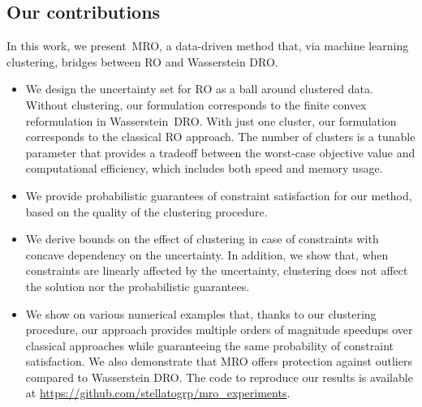

\subsection{Our contributions}%
\label{sub:our_contributions}
In this work, we present~\gls{MRO}, a data-driven method that, via machine learning clustering, bridges between \gls{RO} and  Wasserstein \gls{DRO}.
\begin{itemize}
	\item We design the uncertainty set for \gls{RO} as a ball around clustered data. Without clustering, our formulation corresponds to the finite convex reformulation in Wasserstein~\gls{DRO}.
With just one cluster, our formulation corresponds to the classical \gls{RO} approach.
The number of clusters is a tunable parameter that provides a tradeoff between the worst-case objective value and computational efficiency, which includes both speed and memory usage.
	\item We provide probabilistic guarantees of constraint satisfaction for our method, based on the quality of the clustering procedure.
	\item We derive bounds on the effect of clustering in case of constraints with concave  dependency on the uncertainty. In addition, we show that, when constraints are linearly affected by the uncertainty, clustering does not affect the solution nor the probabilistic guarantees.
	\item We show on various numerical examples that, thanks to our clustering procedure, our approach provides multiple orders of magnitude speedups over classical approaches while guaranteeing the same probability of constraint satisfaction. We also demonstrate that \gls{MRO} offers protection against outliers compared to Wasserstein \gls{DRO}. The code to reproduce our results is available at \url{https://github.com/stellatogrp/mro_experiments}.
\end{itemize}


